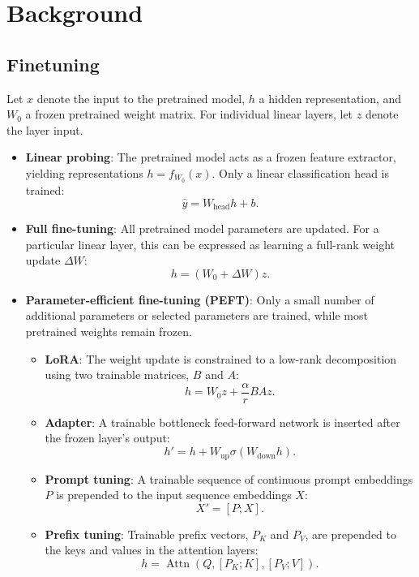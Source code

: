 \section{Background}

\subsection{Finetuning}

Let $x$ denote the input to the pretrained model, $h$ a hidden
representation, and $W_0$ a frozen pretrained weight matrix.
For individual linear layers, let $z$ denote the layer input.

\begin{itemize}
	\item \textbf{Linear probing}: The pretrained model acts as a
	      frozen feature extractor, yielding representations
	      $h = f_{W_0}(x)$. Only a linear classification head is trained:
	      \[
		      \hat{y} = W_{\text{head}} h + b.
	      \]

	\item \textbf{Full fine-tuning}: All pretrained model parameters
	      are updated. For a particular linear layer, this can be expressed
	      as learning a full-rank weight update $\Delta W$:
	      \[
		      h = (W_0 + \Delta W)z.
	      \]

	\item \textbf{Parameter-efficient fine-tuning (PEFT)}:
	      Only a small number of additional parameters or selected
	      parameters are trained, while most pretrained weights remain frozen.
	      \begin{itemize}
		      \item \textbf{LoRA}: The weight update is constrained to
		            a low-rank decomposition using two trainable matrices,
		            $B$ and $A$:
		            \[
			            h = W_0 z + \frac{\alpha}{r}BAz.
		            \]

		      \item \textbf{Adapter}: A trainable bottleneck feed-forward
		            network is inserted after the frozen layer's output:
		            \[
			            h' = h + W_{\text{up}}\sigma(W_{\text{down}}h).
		            \]

		      \item \textbf{Prompt tuning}: A trainable sequence of
		            continuous prompt embeddings $P$ is prepended to the
		            input sequence embeddings $X$:
		            \[
			            X' = [P; X].
		            \]

		      \item \textbf{Prefix tuning}: Trainable prefix vectors,
		            $P_K$ and $P_V$, are prepended to the keys and values
		            in the attention layers:
		            \[
			            h = \operatorname{Attn}
			            \left(Q, [P_K; K], [P_V; V]\right).
		            \]
	      \end{itemize}
\end{itemize}

